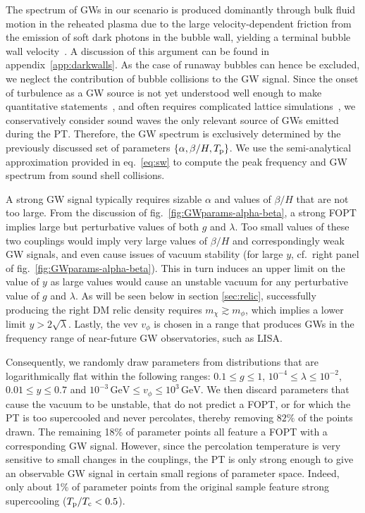 The spectrum of \acp{GW} in our scenario is produced dominantly through bulk fluid motion in the reheated plasma due to the large velocity-dependent friction from the emission of soft dark photons in the bubble wall, yielding a terminal bubble wall velocity~\cite{Bodeker:2017cim,Gouttenoire:2021kjv, Azatov:2023xem}. A discussion of this argument can be found in appendix~\ref{app:darkwalls}. As the case of runaway bubbles can hence be excluded, we neglect the contribution of bubble collisions to the \ac{GW} signal. Since the onset of turbulence as a GW source is not yet understood well enough to make quantitative statements~\cite{Caprini:2019egz}, and often requires complicated lattice simulations~\cite{RoperPol:2019wvy}, we conservatively consider sound waves the only relevant source of \acp{GW} emitted during the \ac{PT}. Therefore, the \ac{GW} spectrum is exclusively determined by the previously discussed set of parameters $\left\{ \alpha, \beta/H, T_{\text{p}} \right\}$. We use the semi-analytical approximation provided in eq.~\eqref{eq:sw} to compute the peak frequency and \ac{GW} spectrum from sound shell collisions.

A strong \ac{GW} signal typically requires sizable $\alpha$ and values of $\beta/H$ that are not too large. From the discussion of fig.~\ref{fig:GWparams-alpha-beta}, a strong \ac{FOPT} implies large but perturbative values of both $g$ and $\lambda$. Too small values of these two couplings would imply very large values of $\beta/H$ and correspondingly weak \ac{GW} signals, and even cause issues of vacuum stability (for large $y$, cf.~right panel of fig.~\ref{fig:GWparams-alpha-beta}). This in turn induces an upper limit on the value of $y$ as large values would cause an  unstable vacuum for any perturbative value of $g$ and $\lambda$. As will be seen below in section \ref{sec:relic}, successfully producing the right \ac{DM} relic density requires $m_\chi \gtrsim m_\phi$, which implies a lower limit $y > 2\sqrt{\lambda}$. Lastly, the \ac{vev} $v_\phi$ is chosen in a range that produces \acp{GW} in the frequency range of near-future \ac{GW} observatories, such as \ac{LISA}.

Consequently, we randomly draw parameters from distributions that are logarithmically flat within the following ranges: $0.1 \leq g \leq 1$, $10^{-4} \leq \lambda \leq 10^{-2}$, $0.01 \leq y \leq 0.7$ and $10^{-3} \, \text{GeV} \leq v_{\phi} \leq 10^{3}\, \text{GeV}$. We then discard parameters that cause  the vacuum to be unstable, that do not predict a \ac{FOPT}, or for which the \ac{PT} is too supercooled and never percolates, thereby removing $82\%$ of the points drawn.  The remaining 18\% of parameter points all feature a \ac{FOPT} with a corresponding \ac{GW} signal. However, since the percolation temperature is very sensitive to small changes in the couplings, the \ac{PT} is only strong enough to give an observable \ac{GW} signal in certain small regions of parameter space. Indeed, only about 1\% of parameter points from the original sample feature strong supercooling ($T_{\text{p}} / T_\text{c} < 0.5$).

